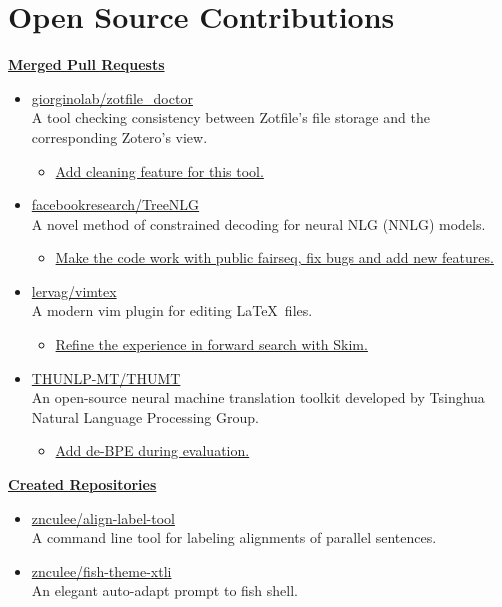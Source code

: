 
\section{\sc Open Source Contributions}

{\bf \href{https://github.com/pulls?q=author%3Aznculee+is%3Amerged}{Merged Pull Requests}}
\begin{itemize}
    \item \href{https://github.com/giorginolab/zotfile_doctor}{giorginolab/zotfile\_doctor} \\
        A tool checking consistency between Zotfile's file storage and the corresponding Zotero's view.
        \begin{itemize}
            \item \href{https://github.com/giorginolab/zotfile_doctor/pull/5}{Add cleaning feature for this tool.}
        \end{itemize}
    \item \href{https://github.com/facebookresearch/TreeNLG}{facebookresearch/TreeNLG} \\
        A novel method of constrained decoding for neural NLG (NNLG) models.
        \begin{itemize}
            \item \href{https://github.com/facebookresearch/TreeNLG/pull/5}{Make the code work with public fairseq, fix bugs and add new features.}
        \end{itemize}
    \item \href{https://github.com/lervag/vimtex}{lervag/vimtex} \\
        A modern vim plugin for editing \LaTeX~files.
        \begin{itemize}
            \item \href{https://github.com/lervag/vimtex/pull/1178}{Refine the experience in forward search with Skim.}
        \end{itemize}
    \item \href{https://github.com/THUNLP-MT/THUMT}{THUNLP-MT/THUMT} \\
        An open-source neural machine translation toolkit developed by Tsinghua Natural Language Processing Group.
        \begin{itemize}
            \item \href{https://github.com/THUNLP-MT/THUMT/pull/45}{Add de-BPE during evaluation.}
        \end{itemize}
\end{itemize}

{\bf \href{https://github.com/znculee?tab=repositories}{Created Repositories}}
\begin{itemize}
    \item \href{https://github.com/znculee/align-label-tool}{znculee/align-label-tool} \\
        A command line tool for labeling alignments of parallel sentences.
    \item \href{https://github.com/znculee/fish-theme-xtli}{znculee/fish-theme-xtli} \\
        An elegant auto-adapt prompt to fish shell.
\end{itemize}
